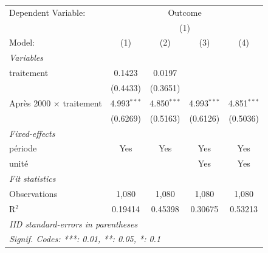 
\begingroup
\centering
\begin{tabular}{lcccc}
   \tabularnewline \midrule \midrule
   Dependent Variable: & \multicolumn{4}{c}{Outcome}\\
    & \multicolumn{4}{c}{(1)} \\ 
   Model:                          & (1)           & (2)           & (3)           & (4)\\  
   \midrule
   \emph{Variables}\\
   traitement                      & 0.1423        & 0.0197        &               &   \\   
                                   & (0.4433)      & (0.3651)      &               &   \\   
   Après 2000 $\times$ traitement  & 4.993$^{***}$ & 4.850$^{***}$ & 4.993$^{***}$ & 4.851$^{***}$\\   
                                   & (0.6269)      & (0.5163)      & (0.6126)      & (0.5036)\\   
   \midrule
   \emph{Fixed-effects}\\
   période                         & Yes           & Yes           & Yes           & Yes\\  
   unité                           &               &               & Yes           & Yes\\  
   \midrule
   \emph{Fit statistics}\\
   Observations                    & 1,080         & 1,080         & 1,080         & 1,080\\  
   R$^2$                           & 0.19414       & 0.45398       & 0.30675       & 0.53213\\  
   \midrule \midrule
   \multicolumn{5}{l}{\emph{IID standard-errors in parentheses}}\\
   \multicolumn{5}{l}{\emph{Signif. Codes: ***: 0.01, **: 0.05, *: 0.1}}\\
\end{tabular}
\par\endgroup



